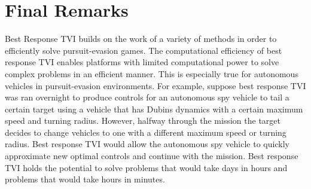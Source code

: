\section{Final Remarks}
Best Response TVI builds on the work of a variety of methods in order to efficiently solve pursuit-evasion games. The computational efficiency of best response TVI enables platforms with limited computational power to solve complex problems in an efficient manner. This is especially true for autonomous vehicles in pursuit-evasion environments. For example, suppose best response TVI was ran overnight to produce controls for an autonomous spy vehicle to tail a certain target using a vehicle that has Dubins dynamics with a certain maximum speed and turning radius. However, halfway through the mission the target decides to change vehicles to one with a different maximum speed or turning radius. Best response TVI would allow the autonomous spy vehicle to quickly approximate new optimal controls and continue with the mission. Best response TVI holds the potential to solve problems that would take days in hours and problems that would take hours in minutes.       
